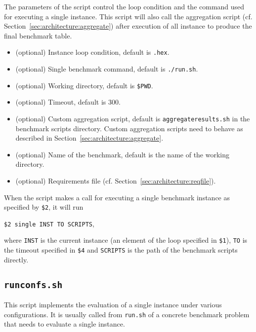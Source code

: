 \documentclass[a4paper]{article}
\begin{document}
		    The parameters of the script control the loop condition
		    and the command used for executing a single instance.
		    This script will also call the aggregation script (cf. Section~\ref{sec:architecture:aggregate})
		    after execution of all instance
		    to produce the final benchmark table.
				
		    \medskip{}
		    \begin{itemize}
				\item[{\tt \$1}:] (optional) Instance loop condition, default is {\tt *.hex}.
				\item[{\tt \$2}:] (optional) Single benchmark command, default is {\tt ./run.sh}.
				\item[{\tt \$3}:] (optional) Working directory, default is {\tt \$PWD}.
				\item[{\tt \$4}:] (optional) Timeout, default is {\tt $300$}.
				\item[{\tt \$5}:] (optional) Custom aggregation script, default is {\tt aggregateresults.sh}
					in the benchmark scripts directory.
					Custom aggregation scripts need to behave as described in Section~\ref{sec:architecture:aggregate}.
				\item[{\tt \$6}:] (optional) Name of the benchmark, default is the name of the working directory.
				\item[{\tt \$7}:] (optional) Requirements file (cf. Section~\ref{sec:architecture:reqfile}).
		    \end{itemize}
		 
		 	When the script makes a call for executing a single benchmark instance
		 	as specified by {\tt \$2}, it will run
		 	\begin{center}
		 		{\tt \$2 single INST TO SCRIPTS},
		 	\end{center}
		 	where {\tt INST} is the current instance (an element of the loop specified in {\tt \$1}),
		 	{\tt TO} is the timeout specified in {\tt \$4}
		 	and {\tt SCRIPTS} is the path of the benchmark scripts directly.
				
		\subsection{\tt runconfs.sh}
		\label{sec:architecture:runconfs}
		
		    This script implements the evaluation of
		    a single instance under various configurations.
		    It is usually called from {\tt run.sh} of a concrete benchmark problem
		    that needs to evaluate a single instance.
		
\end{document}
